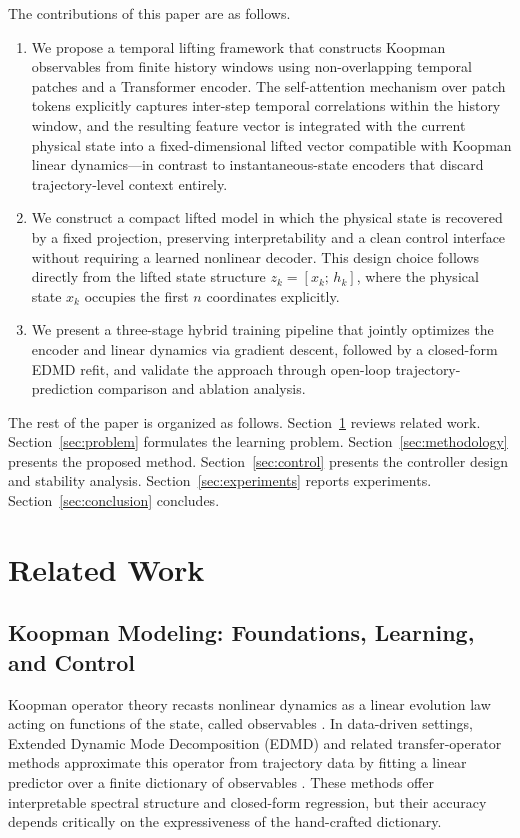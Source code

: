 \documentclass[journal]{IEEEtran}
\begin{document}
The contributions of this paper are as follows.
\begin{enumerate}
    \item We propose a temporal lifting framework that constructs Koopman observables from finite history windows using non-overlapping temporal patches and a Transformer encoder. The self-attention mechanism over patch tokens explicitly captures inter-step temporal correlations within the history window, and the resulting feature vector is integrated with the current physical state into a fixed-dimensional lifted vector compatible with Koopman linear dynamics---in contrast to instantaneous-state encoders that discard trajectory-level context entirely.
    \item We construct a compact lifted model in which the physical state is recovered by a fixed projection, preserving interpretability and a clean control interface without requiring a learned nonlinear decoder. This design choice follows directly from the lifted state structure $z_k = [x_k;\, h_k]$, where the physical state $x_k$ occupies the first $n$ coordinates explicitly.
    \item We present a three-stage hybrid training pipeline that jointly optimizes the encoder and linear dynamics via gradient descent, followed by a closed-form EDMD refit, and validate the approach through open-loop trajectory-prediction comparison and ablation analysis.
\end{enumerate}

The rest of the paper is organized as follows. Section~\ref{sec:related_work} reviews related work. Section~\ref{sec:problem} formulates the learning problem. Section~\ref{sec:methodology} presents the proposed method. Section~\ref{sec:control} presents the controller design and stability analysis. Section~\ref{sec:experiments} reports experiments. Section~\ref{sec:conclusion} concludes.

\section{Related Work}
\label{sec:related_work}

\subsection{Koopman Modeling: Foundations, Learning, and Control}

Koopman operator theory recasts nonlinear dynamics as a linear evolution law acting on functions of the state, called observables \cite{koopman1931hamiltonian, koopman1932spectra, mezic2005spectral, rowley2009spectral}. In data-driven settings, Extended Dynamic Mode Decomposition (EDMD) and related transfer-operator methods approximate this operator from trajectory data by fitting a linear predictor over a finite dictionary of observables \cite{williams2015data, williams2015kernel, klus2018data}. These methods offer interpretable spectral structure and closed-form regression, but their accuracy depends critically on the expressiveness of the hand-crafted dictionary.
\end{document}
